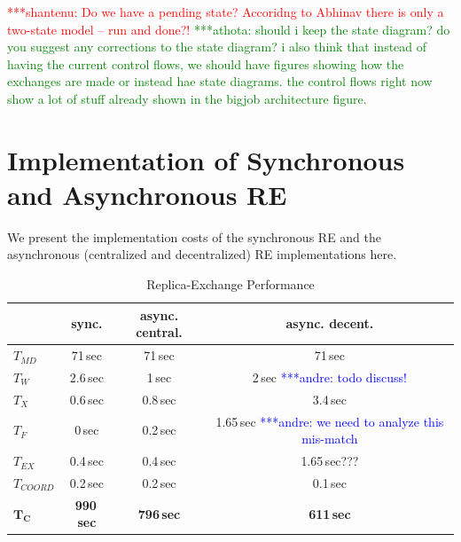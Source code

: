 \documentclass{rspublic}
\newcommand{\jhanote}[1]{ {\textcolor{red} { ***shantenu: #1 }}}
\newcommand{\alnote}[1]{ {\textcolor{blue} { ***andre: #1 }}}
\newcommand{\athotanote}[1]{ {\textcolor{green} { ***athota: #1 }}}
\newcommand{\alnote}[1]{}
\newcommand{\athotanote}[1]{}
\newcommand{\jhanote}[1]{}
\begin{document}
\jhanote{Do we have a pending state? Accoridng to Abhinav there is
  only a two-state model -- run and done?!} \athotanote{should i keep the state diagram? do you suggest any corrections to the state diagram? i also think that instead of having the current control flows, we should have figures showing how the exchanges are made or instead hae state diagrams. the control flows right now show a lot of stuff already shown in the bigjob architecture figure. }
  

\section{Implementation of Synchronous and Asynchronous RE}
\label{sec:re_impl}


We present the implementation costs of the synchronous RE and the
asynchronous (centralized and decentralized) RE implementations here.


\begin{table}
    \centering
	\begin{tabular}{|l|c|c|c|}
	\hline
	                        &sync.  &async. central. &async. decent.\\
	\hline
	$T_{MD}$       &71\,sec &71\,sec &71\,sec\\
	\hline
	\hline
	$T_{W}$        &2.6\,sec &1\,sec &2\,sec\alnote{todo discuss!}\\
	\hline
	\hline
	$T_{X}$        &0.6\,sec &0.8\,sec &3.4\,sec\\
	\hline
	\hspace{2mm}$T_{F}$        &0\,sec   &0.2\,sec &1.65\,sec \alnote{we need to analyze this mis-match}\\
	\hline
	\hspace{2mm}$T_{EX}$       &0.4\,sec &0.4\,sec &1.65\,sec???\\
	\hline
    \hspace{2mm}$T_{COORD}$    &0.2\,sec &0.2\,sec    &0.1\,sec\\
	\hline
	\hline
	$\mathbf{T_{C}}$        &\textbf{990\,sec} &\textbf{796\,sec}    &\textbf{611\,sec}\\
	\hline
    \end{tabular}
	\caption{Replica-Exchange Performance}
	\label{table:repex_perf}
\end{table}
\end{document}
